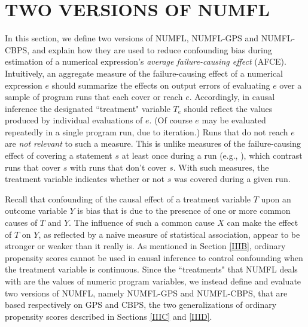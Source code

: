 \documentclass[times]{stvrauth}
\begin{document}
\section{TWO VERSIONS OF NUMFL}\label{twoversion}
In this section, we define two versions of NUMFL, NUMFL-GPS and NUMFL-CBPS, and explain how they are used to reduce confounding bias during estimation of a numerical expression's {\it average failure-causing effect} (AFCE). Intuitively, an aggregate measure of the failure-causing effect of a numerical expression $e$ should summarize the effects on output errors of evaluating $e$ over a sample of program runs that each cover or reach $e$. Accordingly, in causal inference the designated ``treatment" variable $T_e$ should reflect the values produced by individual evaluations of $e$. (Of course $e$ may be evaluated repeatedly in a single program run, due to iteration.) Runs that do not reach $e$ are {\it not relevant} to such a measure. This is unlike measures of the failure-causing effect of covering a statement $s$ at least once during a run (e.g., \cite{Jones2002}), which contrast runs that cover $s$ with runs that don't cover $s$. With such measures, the treatment variable indicates whether or not $s$ was covered during a given run.

Recall that confounding of the causal effect of a treatment variable $T$ upon an outcome variable $Y$ is bias that is due to the presence of one or more common causes of $T$ and $Y$. The influence of such a common cause $X$ can make the effect of $T$ on $Y$, as reflected by a na\"{i}ve measure of statistical association, appear to be stronger or weaker than it really is. As mentioned in Section \ref{IIIB}, ordinary propensity scores cannot be used in causal inference to control confounding when the treatment variable is continuous.  Since the ``treatments" that NUMFL deals with are the values of numeric program variables, we instead define and evaluate two versions of NUMFL, namely NUMFL-GPS and NUMFL-CBPS, that are based respectively on GPS and CBPS, the two generalizations of ordinary propensity scores described in Sections \ref{IIIC} and \ref{IIID}.
\end{document}
